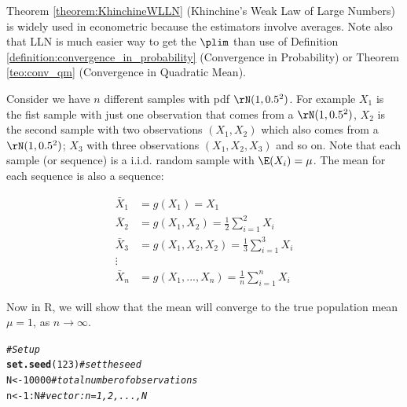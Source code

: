 \documentclass[english,12pt]{book}\usepackage[]{graphicx}\usepackage[]{xcolor}
\makeatletter
\newcommand{\hlnum}[1]{\textcolor[rgb]{0.686,0.059,0.569}{#1}}%
\newcommand{\hlcom}[1]{\textcolor[rgb]{0.678,0.584,0.686}{\textit{#1}}}%
\newcommand{\hlopt}[1]{\textcolor[rgb]{0,0,0}{#1}}%
\newcommand{\hlstd}[1]{\textcolor[rgb]{0.345,0.345,0.345}{#1}}%
\newcommand{\hlkwb}[1]{\textcolor[rgb]{0.69,0.353,0.396}{#1}}%
\newcommand{\hlkwd}[1]{\textcolor[rgb]{0.737,0.353,0.396}{\textbf{#1}}}%
\newenvironment{kframe}{%
 \def\at@end@of@kframe{}%
 \ifinner\ifhmode%
  \def\at@end@of@kframe{\end{minipage}}%
  \begin{minipage}{\columnwidth}%
 \fi\fi%
 \def\FrameCommand##1{\hskip\@totalleftmargin \hskip-\fboxsep
 \colorbox{shadecolor}{##1}\hskip-\fboxsep
     \hskip-\linewidth \hskip-\@totalleftmargin \hskip\columnwidth}%
 \MakeFramed {\advance\hsize-\width
   \@totalleftmargin\z@ \linewidth\hsize
   \@setminipage}}%
 {\par\unskip\endMakeFramed%
 \at@end@of@kframe}
\newenvironment{knitrout}{}{} %
\makeatother
\begin{document}
\begin{remark}
  Theorem \ref{theorem:KhinchineWLLN} (Khinchine's Weak Law of Large Numbers) is widely used in econometric because the estimators involve averages. Note also that LLN is much easier way to get the $\plim$ than use of Definition \ref{definition:convergence_in_probability} (Convergence in Probability) or Theorem \ref{teo:conv_qm} (Convergence in Quadratic Mean).
\end{remark}

\begin{example}
  Consider we have $n$ different samples with pdf $\rN(1, 0.5^2)$. For example $X_1$ is the fist sample with just one observation that comes from a $\rN(1, 0.5^2)$,  $X_2$ is the second sample with two observations $(X_1, X_2)$ which also comes from a $\rN(1, 0.5^2)$; $X_3$ with three observations $(X_1, X_2, X_3)$ and so on. Note that each sample (or sequence) is a i.i.d. random sample with $\E(X_i) = \mu$. The mean for each sequence is also a sequence:
  
\begin{equation*}
  \begin{aligned}
    \bar{X}_1 & = g(X_1) = X_1 \\
    \bar{X}_2 & = g(X_1, X_2) = \frac{1}{2}\sum_{i = 1}^2X_i \\
    \bar{X}_3 & = g(X_1, X_2, X_2) = \frac{1}{3}\sum_{i = 1}^3X_i \\
    \vdots \\
    \bar{X}_n & = g(X_1, ..., X_n) = \frac{1}{n}\sum_{i = 1}^nX_i
  \end{aligned}
\end{equation*}

Now in R, we will show that the mean will converge to the true population mean $\mu = 1$, as $n\to \infty$.

\begin{knitrout}
\color{fgcolor}\begin{kframe}
\begin{alltt}
\hlcom{# Setup}
\hlkwd{set.seed}\hlstd{(}\hlnum{123}\hlstd{)}  \hlcom{# set the seed}
\hlstd{N} \hlkwb{<-} \hlnum{10000}     \hlcom{# total number of observations}
\hlstd{n} \hlkwb{<-} \hlnum{1}\hlopt{:}\hlstd{N}       \hlcom{# vector: n = 1, 2, ..., N}


\end{alltt}
\end{kframe}
\end{knitrout}
\end{example}
\end{document}
